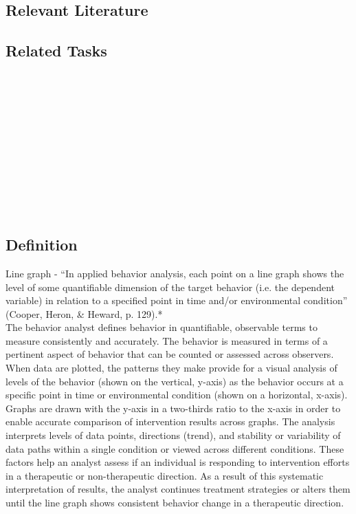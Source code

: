 \subsection{Relevant Literature}
\begin{refsection}
\nocite{cooper2007applied,johnston1993strategies}
\printbibliography[heading=none]
\end{refsection}
%
\subsection{Related Tasks}
\fouraOne{}\\
\fouraTwo{}\\
\fouraThree{}\\
\fouraFour{}\\
\fouraFive{}\\
\fouraSix{}\\
\fouraSeven{}\\
\fouraEight{}\\
\fourhOne{}\\
\fourhTwo{}\\
% 
%
%
%
%
%
\section[\fouraTen{}]{\fouraTen{}%
              }
\subsection{Definition}
Line graph - ``In applied behavior analysis, each point on a line graph shows the level of some quantifiable dimension of the target behavior (i.e. the dependent variable) in relation to a specified point in time and/or environmental condition'' (Cooper, Heron, \& Heward, p. 129).*\\

The behavior analyst defines behavior in quantifiable, observable terms to measure consistently and accurately. The behavior is measured in terms of a pertinent aspect of behavior that can be counted or assessed across observers. When data are plotted, the patterns they make provide for a visual analysis of levels of the behavior (shown on the vertical, y-axis) as the behavior occurs at a specific point in time or environmental condition (shown on a horizontal, x-axis). Graphs are drawn with the y-axis in a two-thirds ratio to the x-axis in order to enable accurate comparison of intervention results across graphs. The analysis interprets levels of data points, directions (trend), and stability or variability of data paths within a single condition or viewed across different conditions. These factors help an analyst assess if an individual is responding to intervention efforts in a therapeutic or non-therapeutic direction. As a result of this systematic interpretation of results, the analyst continues treatment strategies or alters them until the line graph shows consistent behavior change in a therapeutic direction.

